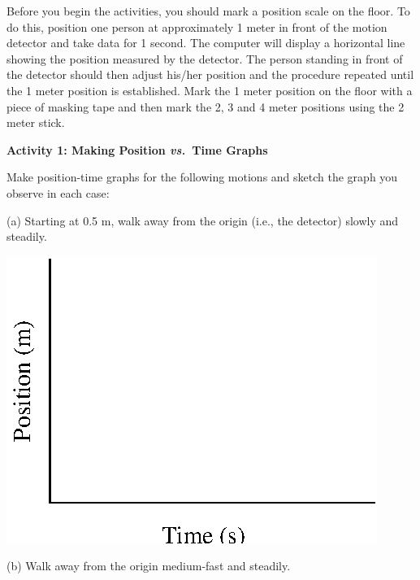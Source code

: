 Before you begin the activities, you should mark a position scale on the floor.
To do this, position one person at approximately 1 meter in front of the motion
detector and take data for 1 second. The computer will display a horizontal
line showing the position measured by the detector. The person standing in front
of the detector should then adjust his/her position and the procedure repeated
until the 1 meter position is established. Mark the 1 meter position on the
floor with a piece of masking tape and then mark the 2, 3 and 4 meter positions
using the 2 meter stick.

\textbf{Activity 1: Making Position \textit{vs.}~Time Graphs }

Make position-time graphs for the following motions and sketch the graph you
observe in each case:

(a) Starting at 0.5 m, walk away from the origin (i.e., the detector) slowly
and steadily.

\vspace{0.3cm}
{\par\centering \includegraphics{position/position_fig1.eps} \par}
\vspace{0.3cm}

(b) Walk away from the origin medium-fast and steadily.

